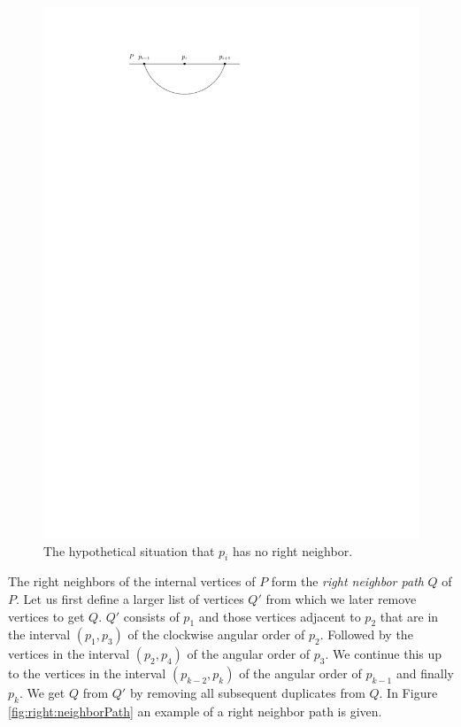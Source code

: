     \begin{figure}[b]
      \centering
      \includegraphics[scale=1]{unifiedAlgo/img/rightNeighbourwalk/pHasRightNeighbor.pdf}
      \caption{The hypothetical situation that $p_i$ has no right neighbor.}
      \label{fig:right:pHasRightNeighbor}
    \end{figure}

    The right neighbors of the internal vertices of $P$ form the \emph{right neighbor path} $Q$ of $P$.
    Let us first define a larger list of vertices $Q'$ from which we later remove vertices to get $Q$. $Q'$ consists of $p_1$ and those vertices adjacent to $p_{2}$ that are in the interval $(p_1, p_3)$ of the clockwise angular order of $p_2$. Followed by the vertices in the interval $(p_2, p_4)$ of the angular order of $p_{3}$. We continue this up to the vertices in the interval $(p_{k-2}, p_k)$ of the angular order of $p_{k-1}$ and finally $p_k$.
    We get $Q$ from $Q'$ by removing all subsequent duplicates from $Q$.
    In Figure \ref{fig:right:neighborPath} an example of a right neighbor path is given.

